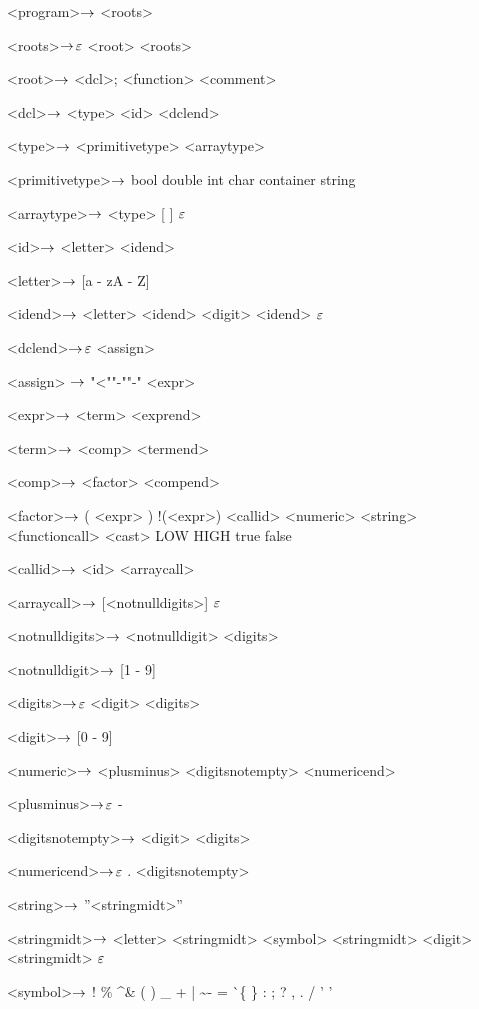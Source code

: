 \begin{grammar}
<program>$\rightarrow$ <roots>

<roots>$\rightarrow$$\varepsilon$
\alt <root> <roots>

<root>$\rightarrow$ <dcl>;
\alt <function>
\alt <comment>

<dcl>$\rightarrow$ <type> <id> <dclend>

<type>$\rightarrow$ <primitivetype> <arraytype>

<primitivetype>$\rightarrow$ bool
\alt double
\alt int
\alt char
\alt container
\alt string

<arraytype>$\rightarrow$ <type> [ ]
\alt$\varepsilon$

<id>$\rightarrow$ <letter> <idend>

<letter>$\rightarrow$ [a - zA - Z]

<idend>$\rightarrow$ <letter> <idend>
	\alt <digit> <idend>
	\alt$\varepsilon$

<dclend>$\rightarrow$$\varepsilon$
\alt <assign> 

<assign> $\rightarrow$ "<""-""-" <expr>

<expr>$\rightarrow$ <term> <exprend>

<term>$\rightarrow$ <comp> <termend>

<comp>$\rightarrow$ <factor> <compend>

<factor>$\rightarrow$ ( <expr> )
	\alt !(<expr>)
	\alt <callid>
	\alt <numeric>
	\alt <string>
	\alt <functioncall> 
	\alt <cast>
	\alt LOW
	\alt HIGH
	\alt true
	\alt false

<callid>$\rightarrow$ <id> <arraycall>

<arraycall>$\rightarrow$ [<notnulldigits>]
\alt$\varepsilon$

<notnulldigits>$\rightarrow$ <notnulldigit> <digits>

<notnulldigit>$\rightarrow$ [1 - 9]

<digits>$\rightarrow$$\varepsilon$
\alt <digit> <digits>

<digit>$\rightarrow$ [0 - 9]

<numeric>$\rightarrow$ <plusminus> <digitsnotempty> <numericend>

<plusminus>$\rightarrow$$\varepsilon$
	\alt -

<digitsnotempty>$\rightarrow$ <digit> <digits>

<numericend>$\rightarrow$$\varepsilon$
\alt . <digitsnotempty>

<string>$\rightarrow$ ''<stringmidt>''

<stringmidt>$\rightarrow$ <letter> <stringmidt>
\alt <symbol> <stringmidt>
\alt <digit> <stringmidt>
\alt$\varepsilon$

<symbol>$\rightarrow$ !
\alt \%
\alt \^
\alt \&
\alt (
\alt )
\alt \_
\alt +
\alt |
\alt \~
\alt -
\alt =
\alt \`
\alt \{
\alt \}
\alt [
\alt ]
\alt :
\alt ;
\alt ?
\alt ,
\alt .
\alt /
\alt ' '


\end{grammar}
